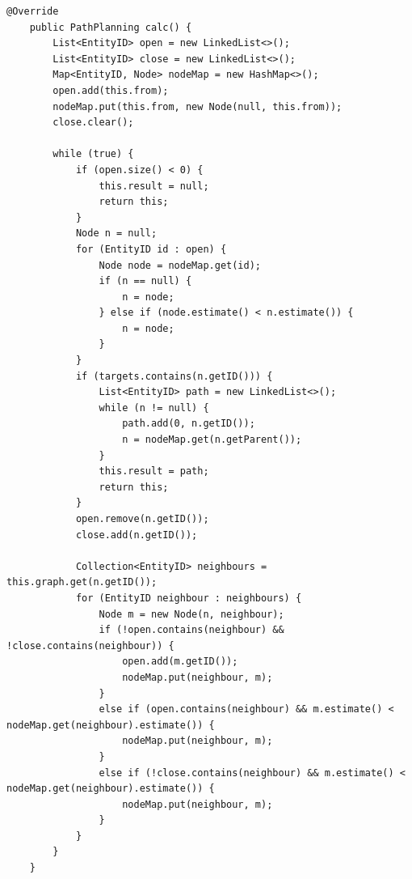 \documentclass{article}
\begin{document}
\begin{lstlisting}[caption=calc(),label=astarpathplan2]
    @Override
    public PathPlanning calc() {
        List<EntityID> open = new LinkedList<>();
        List<EntityID> close = new LinkedList<>();
        Map<EntityID, Node> nodeMap = new HashMap<>();
        open.add(this.from);
        nodeMap.put(this.from, new Node(null, this.from));
        close.clear();

        while (true) {
            if (open.size() < 0) {
                this.result = null;
                return this;
            }
            Node n = null;
            for (EntityID id : open) {
                Node node = nodeMap.get(id);
                if (n == null) {
                    n = node;
                } else if (node.estimate() < n.estimate()) {
                    n = node;
                }
            }
            if (targets.contains(n.getID())) {
                List<EntityID> path = new LinkedList<>();
                while (n != null) {
                    path.add(0, n.getID());
                    n = nodeMap.get(n.getParent());
                }
                this.result = path;
                return this;
            }
            open.remove(n.getID());
            close.add(n.getID());

            Collection<EntityID> neighbours = this.graph.get(n.getID());
            for (EntityID neighbour : neighbours) {
                Node m = new Node(n, neighbour);
                if (!open.contains(neighbour) && !close.contains(neighbour)) {
                    open.add(m.getID());
                    nodeMap.put(neighbour, m);
                }
                else if (open.contains(neighbour) && m.estimate() < nodeMap.get(neighbour).estimate()) {
                    nodeMap.put(neighbour, m);
                }
                else if (!close.contains(neighbour) && m.estimate() < nodeMap.get(neighbour).estimate()) {
                    nodeMap.put(neighbour, m);
                }
            }
        }
    }
\end{lstlisting}
\end{document}
